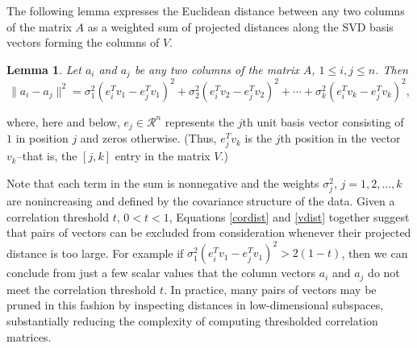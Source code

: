 \documentclass[article]{jss}
\newtheorem{lemma}[theorem]{Lemma}
\newenvironment{proof}[1][Proof]{\begin{trivlist}
\item[\hskip \labelsep {\bfseries #1}]}{\end{trivlist}}
\numberwithin{algorithmctr}{section}
\begin{document}
The following lemma expresses the Euclidean distance between any two columns of
the matrix $A$ as a weighted sum of projected distances along the SVD
basis vectors forming the columns of $V$.
\begin{lemma}
\label{sumlemma}
Let $a_i$ and $a_j$
be any two columns of the matrix
$A$, $1\le i,j\le n$. Then
\begin{equation}\label{vdist}
\|a_i - a_j\|^2 =
\sigma_1^2 (e_i^Tv_{1} - e_j^Tv_{1})^2 + 
\sigma_2^2 (e_i^Tv_{2} - e_j^Tv_{2})^2 + \cdots + 
\sigma_k^2 (e_i^Tv_{k} - e_j^Tv_{k})^2,
\end{equation}
\end{lemma}
where, here and below, $e_{j}\in\mathcal{R}^n$ represents the $j$th unit basis
vector consisting of $1$ in position $j$ and zeros otherwise.
(Thus, $e_j^Tv_{k}$ is the $j$th position in the vector $v_k$--that is, the
$[j,k]$ entry in the matrix $V$.)


Note that each term in the sum is nonnegative and the weights $\sigma_j^2$,
$j=1,2,\ldots,k$ are nonincreasing and defined by the covariance structure of
the data.  Given a correlation threshold $t$, $0<t<1$, Equations \ref{cordist}
and \ref{vdist} together suggest that pairs of vectors can be excluded from
consideration whenever their projected distance is too large.  For example if
$\sigma_1^2 (e_i^Tv_{1} - e_j^Tv_{1})^2 > 2(1-t)$, then we can conclude from
just a few scalar values that the column vectors $a_i$ and $a_j$ do not meet the
correlation threshold $t$.
In practice, many pairs of vectors may be pruned in this fashion by
inspecting distances in low-dimensional subspaces, substantially reducing the
complexity of computing thresholded correlation matrices.
\end{document}
